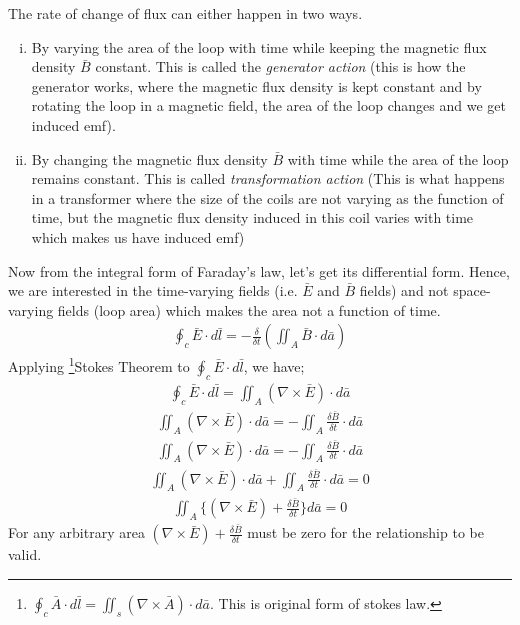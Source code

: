 The rate of change of flux can either happen in two ways.
\begin{enumerate}[(i)]
	\item By varying the area of the loop with time while keeping the magnetic flux density $\bar{B}$ constant. This is called the \emph{generator action} (this is how the generator works, where the magnetic flux density is kept constant and by rotating the loop in a magnetic field, the area of the loop changes and we get induced emf).
	\item By changing the magnetic flux density $\bar{B}$ with time while the area of the loop remains constant. This is called \emph{transformation action} (This is what happens in a transformer where the size of the coils are not varying as the function of time, but the magnetic flux density induced in this coil varies with time which makes us have induced emf)
\end{enumerate}
Now from the integral form of Faraday's law, let's get its differential form. Hence, we are interested in the time-varying fields (i.e. $\bar{E}$ and $\bar{B}$ fields) and not space-varying fields (loop area) which makes the area not a function of time.
\begin{align*}
	{\oint_c\bar{E}\cdot d\bar{l} = -\frac{\delta}{\delta t}(\iint_A\bar{B}\cdot d\bar{a})}
\end{align*}	
Applying \footnote[10]{$\oint_c\bar{A}\cdot d\bar{l} = \iint_s(\nabla \times \bar{A})\cdot d\bar{a}$. This is original form of stokes law.}Stokes Theorem to $\oint_c\bar{E}\cdot d\bar{l}$, we have;
\begin{align*}
	\oint_c\bar{E}\cdot d\bar{l} = \iint_A(\nabla\times\bar{E})\cdot d\bar{a}
\end{align*}
\begin{align*}
	\iint_A(\nabla\times\bar{E})\cdot d\bar{a} = -\iint_A\frac{\delta \bar{B}}{\delta t}\cdot d\bar{a}
\end{align*}
\begin{align*}
	\iint_A(\nabla\times\bar{E})\cdot d\bar{a} = -\iint_A\frac{\delta \bar{B}}{\delta t}\cdot d\bar{a}
\end{align*}
\begin{align*}
	\iint_A(\nabla\times\bar{E})\cdot d\bar{a} + \iint_A\frac{\delta \bar{B}}{\delta t}\cdot d\bar{a} = 0
\end{align*}
\begin{align*}
	\iint_A\{(\nabla \times \bar{E})+ \frac{\delta \bar{B}}{\delta t}\} d\bar{a} = 0
\end{align*} 
For any arbitrary area $(\nabla \times \bar{E})+ \frac{\delta \bar{B}}{\delta t}$ must be zero for the relationship to be valid.

